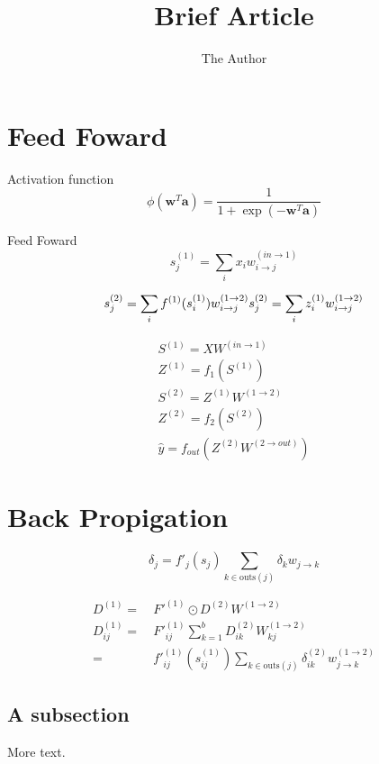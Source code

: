 \documentclass[11pt]{article} %
\title{Brief Article}
\author{The Author}
\begin{document}
\maketitle

\section{Feed Foward}

Activation function
\begin{equation}
\phi (\mathbf{w}^T\mathbf{a}) = \frac{1}{1+\exp(-\mathbf{w}^T\mathbf{a})}
\end{equation}

Feed Foward
\begin{equation}
s_j^{(1)} =\sum_{i} x_{i} w^{(in\rightarrow 1)}_{i\rightarrow j}
\end{equation}

\begin{equation}
  s_j^{(2)} = \sum_{i} f^{(1)}(s_i^{(1)}) w^{(1\rightarrow 2)}_{i\rightarrow j} \\
  s_j^{(2)} = \sum_{i} z_i^{(1)} w^{(1\rightarrow 2)}_{i\rightarrow j}
\end{equation}

\begin{equation}
\begin{aligned}
S^{(1)} = XW^{(in\rightarrow 1)}\\
  Z^{(1)} = f_1(S^{(1)})\\
  S^{(2)} =Z^{(1)}W^{(1\rightarrow 2)}\\
  Z^{(2)} =f_2(S^{(2)})\\
  \hat{y} =f_{out}\left(Z^{(2)}W^{(2\rightarrow out)}\right)
\end{aligned}
\end{equation}

\section{Back Propigation}
\begin{equation}
 \delta_j = f'_j(s_j)\sum_{k\in\text{outs}(j)}\delta_k w_{j\rightarrow k}
\end{equation}

\begin{equation}
\begin{aligned}
D^{(1)} =&\ F'^{(1)}\odot D^{(2)}W^{(1\rightarrow 2)}\\
  D^{(1)}_{ij} =&\ F'^{(1)}_{ij}\sum_{k=1}^bD^{(2)}_{ik}W^{(1\rightarrow 2)}_{kj}\\
  =&\ f'^{(1)}_{ij}(s^{(1)}_{ij})\sum_{k\in\text{outs}(j)}\delta^{(2)}_{ik}w_{j\rightarrow
  k}^{(1\rightarrow 2)}
\end{aligned}
\end{equation}

\subsection{A subsection}

More text.
\end{document}
